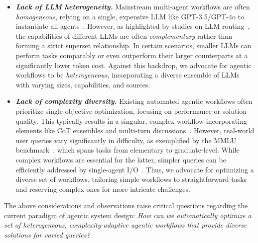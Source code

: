 \documentclass{article}
\theoremstyle{plain}
\theoremstyle{definition}
\theoremstyle{remark}
\begin{document}
\vspace{-1.em}
\begin{itemize}[leftmargin=*,itemsep=-0.1em]
    \item[\ding{224}] \textbf{\textit{Lack of LLM heterogeneity.}}  Mainstream multi-agent workflows are often \textit{homogeneous}, relying on a single, expensive LLM like GPT-3.5/GPT-4o to instantiate all agents~\cite{zhang2024aflow,arXiv2023_AutoAgents}. However, as highlighted by studies on LLM routing~\cite{chen2023frugalgpt,hu2024routerbench}, the capabilities of different LLMs are often \textit{complementary} rather than forming a strict superset relationship. In certain scenarios, smaller LLMs can perform tasks comparably or even outperform their larger counterparts at a significantly lower token cost. Against this backdrop, we advocate for agentic workflows to be \textit{heterogeneous}, incorporating a diverse ensemble of LLMs with varying sizes, capabilities, and sources.
    
    
    \item[\ding{224}] \textbf{\textit{Lack of complexity diversity.}}  Existing automated agentic workflows often prioritize single-objective optimization, focusing on performance or solution quality. This typically results in a singular, complex workflow incorporating elements like CoT ensembles and multi-turn discussions~\citep{hu2024adas,shang2024agentsquare}. However, real-world user queries vary significantly in difficulty, as exemplified by the MMLU benchmark~\cite{mmlu}, which spans tasks from elementary to graduate-level. While complex workflows are essential for the latter, simpler queries can be efficiently addressed by single-agent I/O~\citep{feng2024graphrouter}. Thus, we advocate for optimizing a diverse set of workflows, tailoring simple workflows to straightforward tasks and reserving complex ones for more intricate challenges.
\end{itemize}
\vspace{-0.8em}

The above considerations and observations raise critical questions regarding the current paradigm of agentic system design: \textit{How can we automatically optimize a set of heterogeneous, complexity-adaptive agentic workflows that provide diverse solutions for varied queries?}
\end{document}

